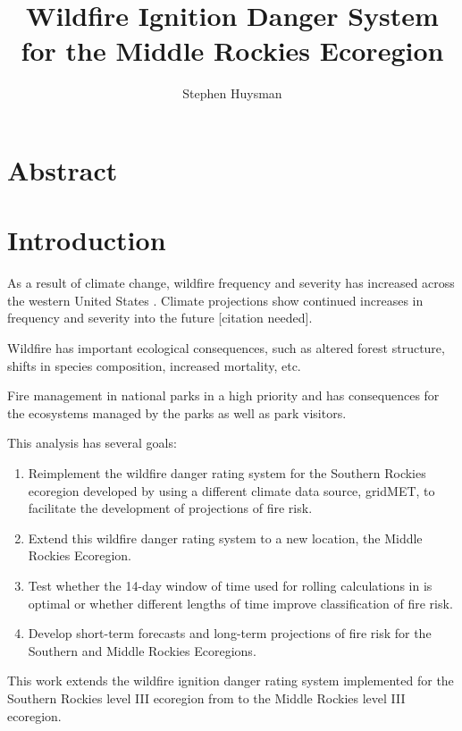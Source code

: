 \documentclass{article}
\author{Stephen Huysman}
\title{Wildfire Ignition Danger System for the Middle Rockies Ecoregion}
\begin{document}
\maketitle


\section{Abstract}

\section{Introduction}

As a result of climate change, wildfire frequency and severity has increased across the western United States \citep{rileyRelationshipLargeFire2013}.  Climate projections show continued increases in frequency and severity into the future [citation needed].

Wildfire has important ecological consequences, such as altered forest structure, shifts in species composition, increased mortality, etc.

Fire management in national parks in a high priority and has consequences for the ecosystems managed by the parks as well as park visitors.

This analysis has several goals:

\begin{enumerate}[label=(\roman*)]
\item Reimplement the wildfire danger rating system for the Southern Rockies ecoregion developed by \citet{thomaWaterBalanceIndicator2020} using a different climate data source, gridMET, to facilitate the development of projections of fire risk.
\item Extend this wildfire danger rating system to a new location, the Middle Rockies Ecoregion.
\item Test whether the 14-day window of time used for rolling calculations in \citet{thomaWaterBalanceIndicator2020} is optimal or whether different lengths of time improve classification of fire risk.
\item Develop short-term forecasts and long-term projections of fire risk for the Southern and Middle Rockies Ecoregions.
\end{enumerate}
  
This work extends the wildfire ignition danger rating system implemented for the Southern Rockies level III ecoregion \citep{omernikEcoregionsConterminousUnited1987} from \citet{thomaWaterBalanceIndicator2020} to the Middle Rockies level III ecoregion.  
\end{document}
